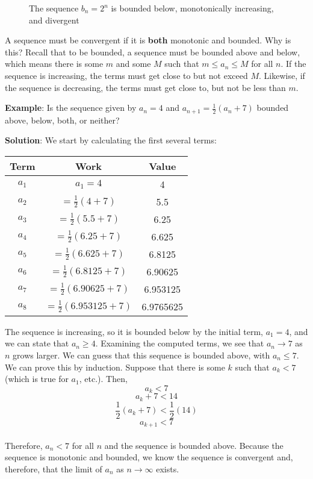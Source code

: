\begin{figure}
    \centering
    \caption{The sequence $b_n = 2^n$ is bounded below, monotonically 
    increasing, and divergent}
    \label{fig:divexp}
\end{figure}

A sequence must be convergent if it is \textbf{both} monotonic and bounded. 
Why is this? Recall that to be bounded, a sequence must be bounded above and 
below, which means there is some $m$ and some $M$ such that $m \leq a_n \leq M$ 
for all $n$. If the sequence is increasing, the terms must get close to but not 
exceed $M$. Likewise, if the sequence is decreasing, the terms must get close 
to, but not be less than $m$.

\textbf{Example}: Is the sequence given by $a_n = 4$ and $a_{n+1} = \frac{1}{2} 
(a_n + 7)$ bounded above, below, both, or neither?

\textbf{Solution}: We start by calculating the first several terms:
\begin{center}
	\begin{tabular}{|c|c|c|}\hline
	Term & Work & Value\\
	\hline
	$a_1$ & $a_1 = 4$ & 4\\
	\hline
	$a_2$ & $=\frac{1}{2}(4 + 7)$ & 5.5\\
	\hline
	$a_3$ & $=\frac{1}{2}(5.5+7)$ & 6.25\\
	\hline
	$a_4$ & $=\frac{1}{2}(6.25+7)$ & 6.625\\
	\hline
	$a_5$ & $=\frac{1}{2}(6.625+7)$ & 6.8125\\
	\hline
	$a_6$ & $=\frac{1}{2}(6.8125+7)$ & 6.90625\\
	\hline
	$a_7$ & $=\frac{1}{2}(6.90625+7)$ & 6.953125\\
	\hline
	$a_8$ & $=\frac{1}{2}(6.953125+7)$ & 6.9765625\\
	\hline	
	\end{tabular}
\end{center}

The sequence is increasing, so it is bounded below by the initial term, $a_1 = 
4$, and we can state that $a_n \geq 4$. Examining the computed terms, we see 
that $a_n \to 7$ as $n$ grows larger. We can guess that this sequence is 
bounded above, with $a_n \leq 7$. We can prove this by induction. Suppose that 
there is some $k$ such that $a_k < 7$ (which is true for $a_1$, etc.). Then,
$$a_k < 7$$
$$a_k + 7 < 14$$
$$\frac{1}{2}(a_k + 7) < \frac{1}{2}(14)$$
$$a_{k + 1} < 7$$\\
Therefore, $a_n < 7$ for all $n$ and the sequence is bounded above. Because 
the sequence is monotonic and bounded, we know the sequence is convergent and, 
therefore, that the limit of $a_n$ as $n \to \infty$ exists. 


